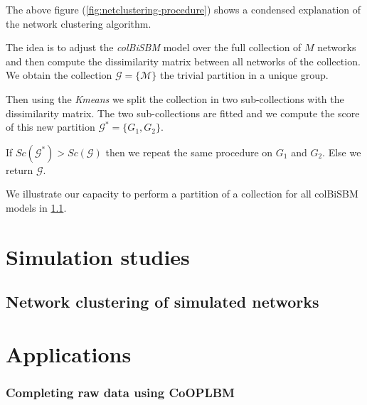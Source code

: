 \documentclass[12pt,a4paper]{report}
\begin{document}
The above figure (\ref{fig:netclustering-procedure}) shows a condensed
explanation of the network clustering algorithm.

The idea is to adjust the \emph{colBiSBM} model over the full collection of $M$
networks and then compute the dissimilarity matrix between all networks of the
collection. We obtain the collection $\mathcal{G} = \{\mathcal{M}\}$ the trivial
partition in a unique group.

Then using the \emph{Kmeans} we split the collection in two sub-collections with
the dissimilarity matrix. The two sub-collections are fitted and we compute
the score of this new partition $\mathcal{G}^{*} = \{G_1, G_2\}$.

If $Sc(\mathcal{G}^{*}) > Sc(\mathcal{G})$ then we repeat the same procedure on
$G_1$ and $G_2$. Else we return $\mathcal{G}$.

We illustrate our capacity to perform a partition of a collection for all
colBiSBM models in \ref{sec:network-clustering-of-simulated-networks}.

\chapter{Simulation studies}\label{chap:simulation-studies}

\section{Network clustering of simulated networks}\label{sec:network-clustering-of-simulated-networks}

\chapter{Applications}

% 
\subsection{Completing raw data using CoOPLBM \parencite{anakokDisentanglingStructureEcological2022}}



\printbibliography
\listoffigures
\listoftables
\end{document}

